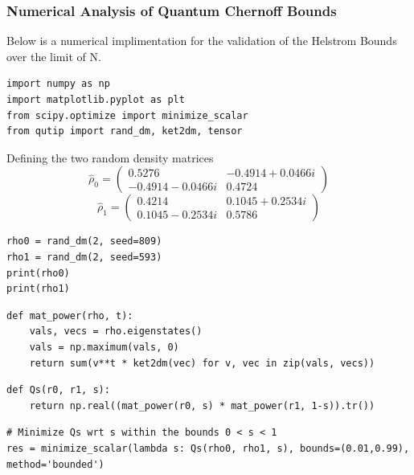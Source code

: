 \subsubsection{Numerical Analysis of Quantum Chernoff Bounds}
Below is a numerical implimentation for the validation of the Helstrom Bounds over the limit of N.

\begin{lstlisting}[style=pythonstyle, caption={Includes}]
import numpy as np
import matplotlib.pyplot as plt
from scipy.optimize import minimize_scalar
from qutip import rand_dm, ket2dm, tensor
\end{lstlisting}


Defining the two random density matrices 
$$
\hat{\rho}_0 = \begin{pmatrix}
0.5276 & -0.4914 + 0.0466i \\
-0.4914 - 0.0466i & 0.4724
\end{pmatrix}
$$
$$
\hat{\rho}_1 = \begin{pmatrix}
0.4214 & 0.1045 + 0.2534i \\
0.1045 - 0.2534i & 0.5786
\end{pmatrix}
$$
\begin{lstlisting}[style=pythonstyle, caption={Defining the two state with random density matrix}]
rho0 = rand_dm(2, seed=809)
rho1 = rand_dm(2, seed=593)
print(rho0)
print(rho1)
\end{lstlisting}


\begin{lstlisting}[style=pythonstyle, caption={Defining a function to calculate the matrix power of rho}]
def mat_power(rho, t):
    vals, vecs = rho.eigenstates()
    vals = np.maximum(vals, 0)
    return sum(v**t * ket2dm(vec) for v, vec in zip(vals, vecs))
\end{lstlisting}

\begin{lstlisting}[style=pythonstyle, caption={Defining a function to return the Qs}]
def Qs(r0, r1, s):
    return np.real((mat_power(r0, s) * mat_power(r1, 1-s)).tr())
\end{lstlisting}

\begin{lstlisting}[style=pythonstyle, caption={Gaussian state discrimination with QuTiP: Helstrom bound and Quantum Chernoff bound}]
# Minimize Qs wrt s within the bounds 0 < s < 1
res = minimize_scalar(lambda s: Qs(rho0, rho1, s), bounds=(0.01,0.99), method='bounded')
\end{lstlisting}


